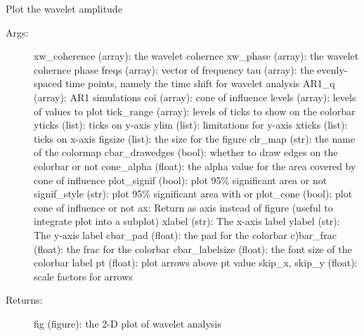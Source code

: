 \documentclass[letterpaper,10pt,english]{sphinxmanual}
\begin{document}
\begin{fulllineitems}
\label{\detokenize{Spectral:pyleoclim.Spectral.plot_coherence}}
Plot the wavelet amplitude
\begin{description}
\item[{Args:}] \leavevmode
xw\_coherence (array): the wavelet cohernce
xw\_phase (array): the wavelet cohernce phase
freqs (array): vector of frequency
tau (array): the evenly-spaced time points, namely the time shift for wavelet analysis
AR1\_q (array): AR1 simulations
coi (array): cone of influence
levels (array): levels of values to plot
tick\_range (array): levels of ticks to show on the colorbar
yticks (list): ticks on y-axis
ylim (list): limitations for y-axis
xticks (list): ticks on x-axis
figsize (list): the size for the figure
clr\_map (str): the name of the colormap
cbar\_drawedges (bool): whether to draw edges on the colorbar or not
cone\_alpha (float): the alpha value for the area covered by cone of influence
plot\_signif (bool): plot 95\% significant area or not
signif\_style (str): plot 95\% significant area with  or 
plot\_cone (bool): plot cone of influence or not
ax: Return as axis instead of figure (useful to integrate plot into a subplot)
xlabel (str): The x-axis label
ylabel (str): The y-axis label
cbar\_pad (float): the pad for the colorbar
c)bar\_frac (float): the frac for the colorbar
cbar\_labelsize (float): the font size of the colorbar label
pt (float): plot arrows above pt value
skip\_x, skip\_y (float): scale factors for arrows

\item[{Returns:}] \leavevmode
fig (figure): the 2-D plot of wavelet analysis

\end{description}

\end{fulllineitems}

\end{document}
